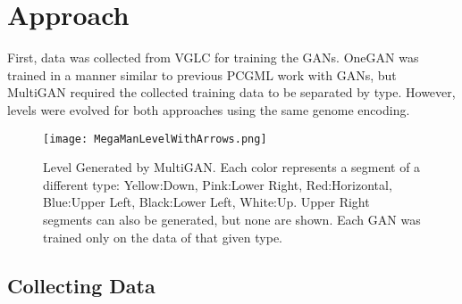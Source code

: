 
\section{Approach}

First, data was collected from VGLC for training the GANs. OneGAN was trained in a manner similar to previous PCGML work with GANs, but MultiGAN required the collected training data to be separated by type. However, levels were evolved for both approaches using the same genome encoding.


\begin{figure}[t]
\centering
\texttt{[image: MegaManLevelWithArrows.png]}
\caption{Level Generated by MultiGAN. \normalfont Each color represents a segment of a different type: Yellow:Down, Pink:Lower Right, Red:Horizontal, Blue:Upper Left, Black:Lower Left, White:Up. Upper Right segments can also be generated, but none are shown. Each GAN was trained only on the data of that given type.}
\label{fig:MultiGANmodel}
\end{figure}


\subsection{Collecting Data}


